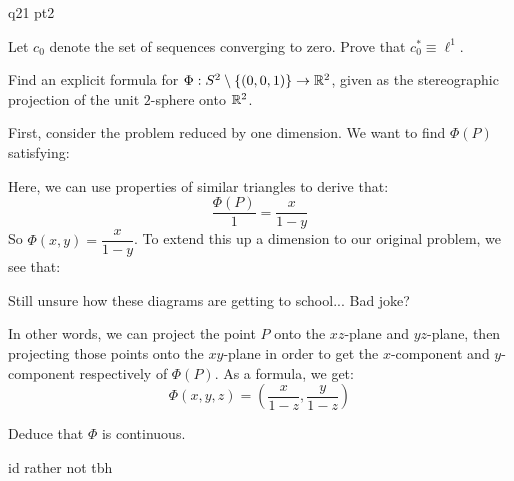 \documentclass{article}
\begin{document}
\begin{qu}
    q21 pt2
\end{qu}

\newpage
{}

\begin{qu}
    Let $ c_{0} $ denote the set of sequences converging to zero.
    Prove that $ c_{0}^{*} \equiv \ell^{1} $.
\end{qu}

\newpage
{}

\begin{qu}
    Find an explicit formula for $ \Phi : S^{2} \setminus \left\{{(0, 0, 1)}\right\} \rightarrow \mathbb{R}^{2} $,
    given as the stereographic projection of the unit $ 2 $-sphere onto $ \mathbb{R}^{2} $.
\end{qu}

\begin{soln}
    First, consider the problem reduced by one dimension.
    We want to find $ \Phi(P) $ satisfying:

    \centering
    \flushleft

    Here, we can use properties of similar triangles to derive that:
    \begin{equation*}
        \frac{\Phi(P)}{1} = \frac{x}{1-y}
    \end{equation*}
    So $ \Phi(x, y) = \dfrac{x}{1-y} $. To extend this up a dimension to our original problem,
    we see that:
    
    \centering
    Still unsure how these diagrams are getting to school... Bad joke?
    \flushleft
    
    In other words, we can project the point $ P $ onto the $ xz $-plane and $ yz $-plane, then
    projecting those points onto the $ xy $-plane in order to get the $ x $-component and
    $ y $-component respectively of $ \Phi(P) $. As a formula, we get:
    \begin{equation*}
        \Phi(x, y, z) = \left( \frac{x}{1-z}, \frac{y}{1-z} \right)
    \end{equation*}
\end{soln}

\begin{qu}
    Deduce that $ \Phi $ is continuous.
\end{qu}

\begin{soln}
    id rather not tbh
\end{soln}
\end{document}
